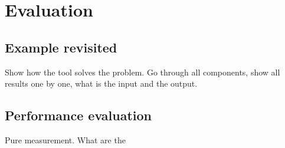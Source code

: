 \chapter{Evaluation}

\section{Example revisited}
Show how the tool solves the problem. Go through all components, show all
results one by one, what is the input and the output.

\section{Performance evaluation}
Pure measurement. What are the 